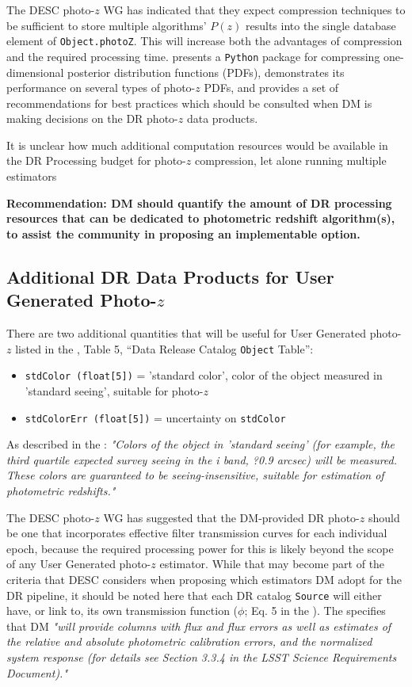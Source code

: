 \documentclass[DM,lsstdraft,toc]{lsstdoc}
\begin{document}
The DESC photo-$z$ WG has indicated that they expect compression techniques to be sufficient to store multiple algorithms' $P(z)$ results into the single database element of \texttt{Object.photoZ}. This will increase both the advantages of compression and the required processing time. \citet{2018AJ....156...35M} presents a {\tt Python} package for compressing one-dimensional posterior distribution functions (PDFs), demonstrates its performance on several types of photo-$z$ PDFs, and provides a set of recommendations for best practices which should be consulted when DM is making decisions on the DR photo-$z$ data products.

It is unclear how much additional computation resources would be available in the DR Processing budget for photo-$z$ compression, let alone running multiple estimators

\textbf{Recommendation: DM should quantify the amount of DR processing resources that can be dedicated to photometric redshift algorithm(s), to assist the community in proposing an implementable option.}


\subsection{Additional DR Data Products for User Generated Photo-$z$}\label{ssec:tech_user}

There are two additional quantities that will be useful for User Generated photo-$z$ listed in the \DPDD, Table 5, ``Data Release Catalog {\tt Object} Table'':

\begin{itemize}
\item \texttt{stdColor (float[5])} = 'standard color', color of the object measured in 'standard seeing', suitable for photo-$z$
\item \texttt{stdColorErr (float[5])} = uncertainty on \texttt{stdColor}
\end{itemize}

As described in the \DPDD: {\it "Colors of the object in 'standard seeing' (for example, the third quartile expected survey seeing in the i band, ?0.9 arcsec) will be measured. These colors are guaranteed to be seeing-insensitive, suitable for estimation of photometric redshifts."}

The DESC photo-$z$ WG has suggested that the DM-provided DR photo-$z$ should be one that incorporates effective filter transmission curves for each individual epoch, because the required processing power for this is likely beyond the scope of any User Generated photo-$z$ estimator. While that may become part of the criteria that DESC considers when proposing which estimators DM adopt for the DR pipeline, it should be noted here that each DR catalog {\tt Source} will either have, or link to, its own transmission function ($\phi$; Eq. 5 in the \SRD). The \DPDD specifies that DM {\it "will provide columns with flux and flux errors as well as estimates of the relative and absolute photometric calibration errors, and the normalized system response (for details see Section 3.3.4 in the LSST Science Requirements Document)."} 
\end{document}
